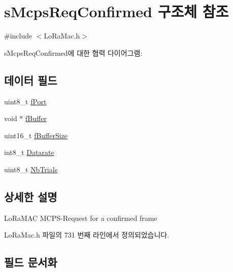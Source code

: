 \hypertarget{structs_mcps_req_confirmed}{}\section{s\+Mcps\+Req\+Confirmed 구조체 참조}
\label{structs_mcps_req_confirmed}


{\ttfamily \#include $<$Lo\+Ra\+Mac.\+h$>$}



s\+Mcps\+Req\+Confirmed에 대한 협력 다이어그램\+:
\subsection*{데이터 필드}
\begin{DoxyCompactItemize}
\item 
uint8\+\_\+t \mbox{\hyperlink{structs_mcps_req_confirmed_a2973de9ac0ab5e876b80362bc4c6a88b}{f\+Port}}
\item 
void $\ast$ \mbox{\hyperlink{structs_mcps_req_confirmed_a2e9f11cf5a8f2a797999359bedee31af}{f\+Buffer}}
\item 
uint16\+\_\+t \mbox{\hyperlink{structs_mcps_req_confirmed_a6b4fc83528d7391a193516d9f4ba985b}{f\+Buffer\+Size}}
\item 
int8\+\_\+t \mbox{\hyperlink{structs_mcps_req_confirmed_ae2f6080f3aa0e9485c55513ca56bb24d}{Datarate}}
\item 
uint8\+\_\+t \mbox{\hyperlink{structs_mcps_req_confirmed_a9da59688c25c389a323e4d155fca3a47}{Nb\+Trials}}
\end{DoxyCompactItemize}


\subsection{상세한 설명}
Lo\+Ra\+M\+AC M\+C\+P\+S-\/\+Request for a confirmed frame 

Lo\+Ra\+Mac.\+h 파일의 731 번째 라인에서 정의되었습니다.



\subsection{필드 문서화}
\mbox{\label{structs_mcps_req_confirmed_ae2f6080f3aa0e9485c55513ca56bb24d}} 
